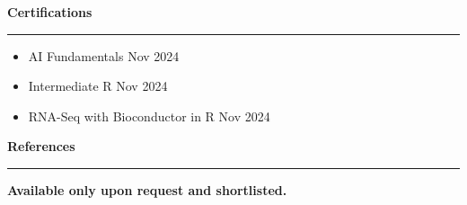 \documentclass[a4paper,10pt]{article}
\newcommand{\sectiontitle}[1]{\vspace{10pt}\textbf{\Large #1}\vspace{5pt}\hrule\vspace{10pt}}
\begin{document}
	\sectiontitle{Certifications}
	\begin{itemize}[left=0pt]
		\item AI Fundamentals \dotfill Nov 2024
		\item Intermediate R \dotfill Nov 2024
		\item RNA-Seq with Bioconductor in R \dotfill Nov 2024
	\end{itemize}
	
	\sectiontitle{References}
	\textbf{Available only upon request and shortlisted.}
	
\end{document}
